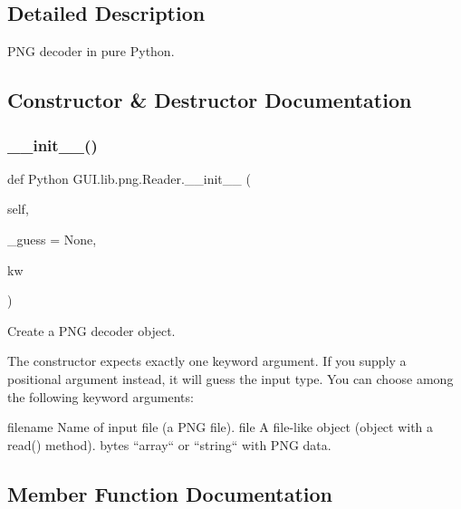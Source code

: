 \subsection{Detailed Description}
\begin{DoxyVerb}PNG decoder in pure Python.
\end{DoxyVerb}
 

\subsection{Constructor \& Destructor Documentation}
\mbox{\label{class_python_01_g_u_i_1_1lib_1_1png_1_1_reader_a1b418d2d6104b7dd95cc8703051d8a1f}} 
\subsubsection{\texorpdfstring{\+\_\+\+\_\+init\+\_\+\+\_\+()}{\_\_init\_\_()}}
{\footnotesize\ttfamily def Python G\+U\+I.\+lib.\+png.\+Reader.\+\_\+\+\_\+init\+\_\+\+\_\+ (\begin{DoxyParamCaption}\item[{}]{self,  }\item[{}]{\+\_\+guess = {\ttfamily None},  }\item[{}]{kw }\end{DoxyParamCaption})}

\begin{DoxyVerb}Create a PNG decoder object.

The constructor expects exactly one keyword argument. If you
supply a positional argument instead, it will guess the input
type. You can choose among the following keyword arguments:

filename
  Name of input file (a PNG file).
file
  A file-like object (object with a read() method).
bytes
  ``array`` or ``string`` with PNG data.\end{DoxyVerb}
 

\subsection{Member Function Documentation}
\mbox{\label{class_python_01_g_u_i_1_1lib_1_1png_1_1_reader_a9854b6edd68ba190d24f229422832841}} 
